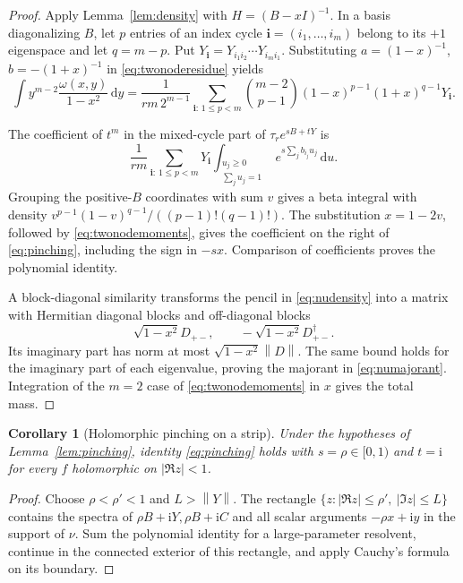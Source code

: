 \documentclass[11pt]{amsart}
\newtheorem{corollary}[theorem]{Corollary}
\theoremstyle{remark}
\theoremstyle{plain}
\numberwithin{equation}{section}
\newcommand{\ii}{\mathrm i}
\newcommand{\dd}{\,\mathrm d}
\newcommand{\norm}[1]{\left\|#1\right\|}
\begin{document}
\begin{proof}
Apply Lemma~\ref{lem:density} with \(H=(B-xI)^{-1}\).
In a basis diagonalizing \(B\), let \(p\) entries of an index cycle
\(\mathbf i=(i_1,\ldots,i_m)\) belong to its \(+1\) eigenspace and
let \(q=m-p\). Put
\(Y_{\mathbf i}=Y_{i_1i_2}\cdots Y_{i_mi_1}\).
Substituting \(a=(1-x)^{-1}\), \(b=-(1+x)^{-1}\) in
\eqref{eq:twonoderesidue} yields
\begin{equation}\label{eq:twonodemoments}
 \int y^{m-2}\frac{\omega(x,y)}{1-x^2}\dd y
 =\frac1{rm\,2^{m-1}}
 \sum_{\mathbf i:\,1\le p<m}
 \binom{m-2}{p-1}
 (1-x)^{p-1}(1+x)^{q-1}Y_{\mathbf i}.
\end{equation}

The coefficient of \(t^m\) in the mixed-cycle part of
\(\tau_r e^{sB+tY}\) is
\[
 \frac1{rm}\sum_{\mathbf i:\,1\le p<m}Y_{\mathbf i}
 \int_{\substack{u_j\ge0\\\sum_ju_j=1}}
 e^{s\sum_jb_{i_j}u_j}\dd u.
\]
Grouping the positive-\(B\) coordinates with sum \(v\) gives a beta
integral with density
\(v^{p-1}(1-v)^{q-1}/((p-1)!(q-1)!)\).
The substitution \(x=1-2v\), followed by
\eqref{eq:twonodemoments}, gives the coefficient on the right of
\eqref{eq:pinching}, including the sign in \(-sx\).
Comparison of coefficients proves the polynomial identity.

A block-diagonal similarity transforms the pencil in
\eqref{eq:nudensity} into a matrix with Hermitian diagonal blocks
and off-diagonal blocks
\[
 \sqrt{1-x^2}D_{+-},\qquad
 -\sqrt{1-x^2}D_{+-}^\dagger.
\]
Its imaginary part has norm at most
\(\sqrt{1-x^2}\norm D\). The same bound holds for the imaginary part
of each eigenvalue, proving the majorant in \eqref{eq:numajorant}.
Integration of the \(m=2\) case of \eqref{eq:twonodemoments} in \(x\)
gives the total mass.
\end{proof}

\begin{corollary}[Holomorphic pinching on a strip]\label{cor:holomorphic}
Under the hypotheses of Lemma~\ref{lem:pinching},
identity \eqref{eq:pinching} holds with \(s=\rho\in[0,1)\) and
\(t=\ii\) for every \(f\) holomorphic on \(|\Re z|<1\).
\end{corollary}

\begin{proof}
Choose \(\rho<\rho'<1\) and \(L>\norm Y\).
The rectangle
\(\{z:|\Re z|\le\rho',\ |\Im z|\le L\}\)
contains the spectra of \(\rho B+\ii Y,\rho B+\ii C\) and all scalar
arguments \(-\rho x+\ii y\) in the support of \(\nu\).
Sum the polynomial identity for a large-parameter resolvent, continue
in the connected exterior of this rectangle, and apply Cauchy's
formula on its boundary.
\end{proof}
\end{document}
